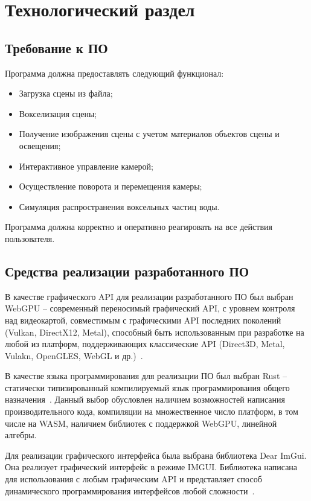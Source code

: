 \chapter{Технологический раздел}

\section{Требование к ПО}

Программа должна предоставлять следующий функционал:
\begin{itemize}[label*=---]
    \item Загрузка сцены из файла;
    \item Вокселизация сцены;
    \item Получение изображения сцены с учетом материалов объектов сцены и освещения;
    \item Интерактивное управление камерой;
    \item Осуществление поворота и перемещения камеры;
    \item Симуляция распространения воксельных частиц воды.
\end{itemize}

Программа должна корректно и оперативно реагировать на все действия пользователя.

\section{Средства реализации разработанного ПО}

В качестве графического API для реализации разработанного ПО 
был выбран WebGPU -- современный переносимый графический
API, с уровнем контроля над видеокартой, совместимым с графическими API последних поколений 
(Vulkan, DirectX12, Metal), способный быть использованным при разработке на любой из платформ, 
поддерживающих классические API (Direct3D, Metal, Vulakn, OpenGLES, WebGL и др.)~\cite{WebGPU}.

В качестве языка программирования для реализации ПО был выбран Rust -- 
статически типизированный компилируемый язык программирования общего назначения~\cite{Rust}.
Данный выбор обусловлен наличием возможностей написания производительного кода, 
компиляции на множественное число платформ, в том числе на WASM, наличием
библиотек с поддержкой WebGPU, линейной алгебры.

Для реализации графического интерфейса была выбрана библиотека Dear ImGui.
Она реализует графический интерфейс в режиме IMGUI. Библиотека написана 
для использования с любым графическим API и представляет способ динамического 
программирования интерфейсов любой сложности~\cite{ImGui}.

